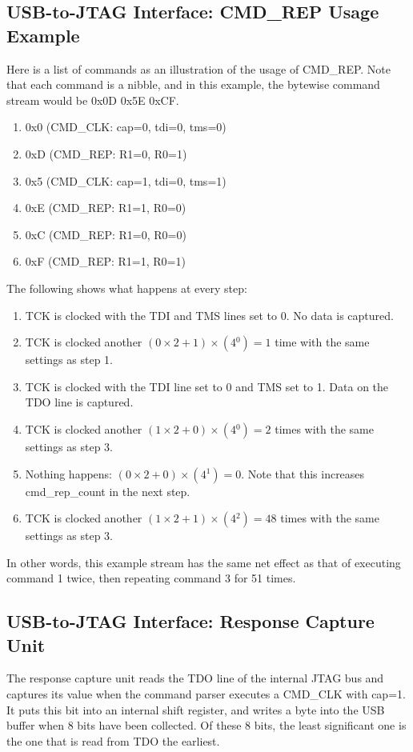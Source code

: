 \documentclass[main\_\_EN.tex]{subfiles}
\begin{document}
\subsection{USB-to-JTAG Interface: CMD\_REP Usage Example}    


Here is a list of commands as an illustration of the usage of CMD\_REP.
Note that each command is a nibble, and in this example, the bytewise command stream would be 0x0D 0x5E 0xCF.

\begin{enumerate}
\item 0x0 (CMD\_CLK: cap=0, tdi=0, tms=0)
\item 0xD (CMD\_REP: R1=0, R0=1)
\item 0x5 (CMD\_CLK: cap=1, tdi=0, tms=1)
\item 0xE (CMD\_REP: R1=1, R0=0)
\item 0xC (CMD\_REP: R1=0, R0=0)
\item 0xF (CMD\_REP: R1=1, R0=1)
\end{enumerate}


The following shows what happens at every step:
\begin{enumerate}
\item TCK is clocked with the TDI and TMS lines set to 0. No data is captured.
\item TCK is clocked another \((0\times2+1)\times(4{^0})=1\) time with the same settings as step 1.
\item TCK is clocked with the TDI line set to 0 and TMS set to 1. Data on the TDO line is captured.
\item TCK is clocked another \((1\times2+0)\times(4{^0})=2\) times with the same settings as step 3.
\item Nothing happens: \((0\times2+0)\times(4{^1})=0\). Note that this increases cmd\_rep\_count in the next step.
\item TCK is clocked another \((1\times2+1)\times(4{^2})=48\) times with the same settings as step 3.
\end{enumerate}

In other words, this example stream has the same net effect as that of executing command 1 twice, then repeating command 3 for 51 times.

\subsection{USB-to-JTAG Interface: Response Capture Unit}

The response capture unit reads the TDO line of the internal JTAG bus and captures its value when the command parser executes a CMD\_CLK with cap=1. It puts this bit into an internal shift register, and writes a byte into the USB buffer when 8 bits have been collected. Of these 8 bits, the least significant one is the one that is read from TDO the earliest.
\end{document}
